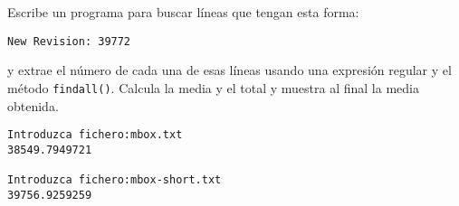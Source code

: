 \begin{ex}
Escribe un programa para buscar líneas que tengan esta forma:

\verb"New Revision: 39772"

y extrae el número de cada una de esas líneas usando una expresión regular
y el método {\tt findall()}. Calcula la media y el total y
muestra al final la media obtenida.

\beforeverb
\begin{verbatim}
Introduzca fichero:mbox.txt 
38549.7949721

Introduzca fichero:mbox-short.txt
39756.9259259
\end{verbatim}
\afterverb
%

\end{ex}